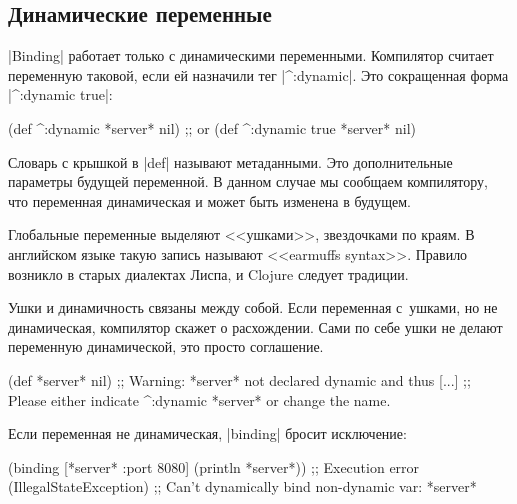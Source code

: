 \subsection{Динамические переменные}


\label{dynamic-vars}

\spverb|Binding| работает только с динамическими переменными. Компилятор считает
переменную таковой, если ей назначили тег \spverb|^:dynamic|. Это сокращенная
форма \spverb|^{:dynamic true}|:

\begin{english}
  \begin{clojure}
(def ^:dynamic *server* nil)
;; or
(def ^{:dynamic true} *server* nil)
  \end{clojure}
\end{english}

Словарь с крышкой в \spverb|def| называют метаданными. Это дополнительные
параметры будущей переменной. В данном случае мы сообщаем компилятору, что
переменная динамическая и может быть изменена в будущем.

Глобальные переменные выделяют <<ушками>>, звездочками по краям. В
английском языке такую запись называют <<earmuffs syntax>>. Правило возникло в
старых диалектах Лиспа, и Clojure следует традиции.


Ушки и динамичность связаны между собой. Если переменная с~ушками, но не
динамическая, компилятор скажет о расхождении. Сами по себе ушки не делают
переменную динамической, это просто соглашение.

\begin{english}
  \begin{clojure}
(def *server* nil)
;; Warning: *server* not declared dynamic and thus [...]
;; Please either indicate ^:dynamic *server* or change the name.
  \end{clojure}
\end{english}

\noindent
Если переменная не динамическая, \spverb|binding| бросит исключение:

\begin{english}
  \begin{clojure}
(binding [*server* {:port 8080}]
  (println *server*))
;; Execution error (IllegalStateException)
;; Can't dynamically bind non-dynamic var: *server*
  \end{clojure}
\end{english}

